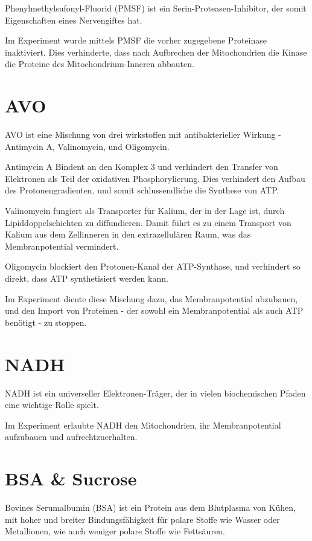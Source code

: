 \documentclass[a4paper,german]{scrreprt}
\begin{document}
Phenylmethylsufonyl-Fluorid (PMSF) ist ein Serin-Proteasen-Inhibitor, der somit
Eigenschaften eines Nervengiftes hat.

Im Experiment wurde mittels PMSF die vorher zugegebene Proteinase
inaktiviert. Dies verhinderte, dass nach Aufbrechen der Mitochondrien die
Kinase die Proteine des Mitochondrium-Inneren abbauten.

\section{AVO}

AVO ist eine Mischung von drei wirkstoffen mit antibakterieller Wirkung -
Antimycin A, Valinomycin, und Oligomycin.

Antimycin A Bindent an den Komplex 3 und verhindert den Transfer von Elektronen
als Teil der oxidativen Phosphorylierung. Dies verhindert den Aufbau des
Protonengradienten, und somit schlussendliche die Synthese von ATP.

Valinomycin fungiert als Transporter für Kalium, der in der Lage ist, durch
Lipiddoppelschichten zu diffundieren. Damit führt es zu einem Transport von
Kalium aus dem Zellinneren in den extrazellulären Raum, was das
Membranpotential vermindert.

Oligomycin blockiert den Protonen-Kanal der ATP-Synthase, und verhindert so
direkt, dass ATP synthetisiert werden kann.

Im Experiment diente diese Mischung dazu, das Membranpotential abzubauen, und den
Import von Proteinen - der sowohl ein Membranpotential als auch ATP benötigt - zu
stoppen.

\section{NADH}

NADH ist ein universeller Elektronen-Träger, der in vielen biochemischen Pfaden
eine wichtige Rolle spielt.

Im Experiment erlaubte NADH den Mitochondrien, ihr Membranpotential aufzubauen
und aufrechtzuerhalten.

\section{BSA \& Sucrose}

Bovines Serumalbumin (BSA) ist ein Protein aus dem Blutplasma von Kühen, mit
hoher und breiter Bindungsfähigkeit für polare Stoffe wie Wasser oder
Metallionen, wie auch weniger polare Stoffe wie Fettsäuren.
\end{document}
